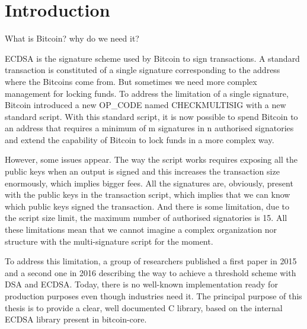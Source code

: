 \chapter{Introduction}
\label{chap:introduction}

What is Bitcoin? why do we need it? \cite{crypto-2001-1592, DBLP:conf/acns/GennaroGN16, Paillier:1999:PCB:1756123.1756146,
Goldfeder2015SecuringBW, Bellare:1993:ROP:168588.168596}

ECDSA is the signature scheme used by Bitcoin to sign transactions. A standard transaction
is constituted of a single signature corresponding to the address where the Bitcoins come
from. But sometimes we need more complex management for locking funds. To address the
limitation of a single signature, Bitcoin introduced a new OP\_CODE named CHECKMULTISIG with
a new standard script. With this standard script, it is now possible to spend Bitcoin to an
address that requires a minimum of m signatures in n authorised signatories and extend the
capability of Bitcoin to lock funds in a more complex way.

However, some issues appear. The way the script works requires exposing all the public keys
when an output is signed and this increases the transaction size enormously, which implies
bigger fees. All the signatures are, obviously, present with the public keys in the transaction
script, which implies that we can know which public keys signed the transaction. And there
is some limitation, due to the script size limit, the maximum number of authorised signatories
is 15. All these limitations mean that we cannot imagine a complex organization nor structure
with the multi-signature script for the moment.

To address this limitation, a group of researchers published a first paper  in 2015 and a
second one  in 2016 describing the way to achieve a threshold scheme with DSA and ECDSA.
Today, there is no well-known implementation ready for production purposes even though
industries need it. The principal purpose of this thesis is to provide a clear, well
documented C library, based on the internal ECDSA library present in bitcoin-core.

